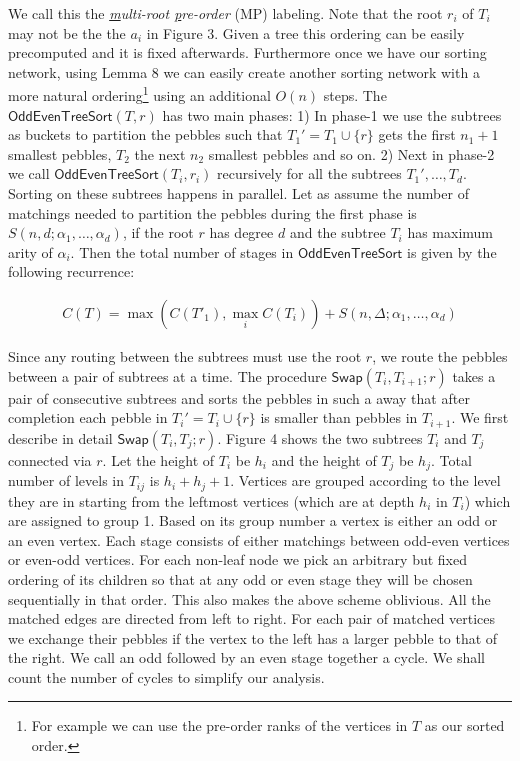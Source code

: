 \documentclass[runningheads,a4paper]{llncs}
\begin{document}
	

	
\noindent We call this the \textit{\underline{m}ulti-root \underline{p}re-order} (MP) labeling. Note that the root $r_i$ of $T_i$ may not be the the $a_i$ in Figure 3. Given a tree this ordering can be easily precomputed and it is fixed afterwards. Furthermore once we have our sorting network, using Lemma 8 we can easily create another sorting network with a more natural ordering\footnote{For example we can use the pre-order ranks of the vertices in $T$ as our sorted order.} using an additional $O(n)$ steps.
 The $\mathsf{OddEvenTreeSort}(T, r)$ has two main phases: 1) In phase-1 we use the subtrees as buckets to partition the pebbles such that $T_1' = T_1\cup\{r\}$ gets the first $n_1+1$ smallest pebbles, $T_2$ the next $n_2$ smallest pebbles and so on. 
2) Next in phase-2 we call $\mathsf{OddEvenTreeSort}(T_i,r_i)$ recursively for all the subtrees $T_1',\ldots,T_{d}$. Sorting on these subtrees happens in parallel. Let as assume the number of matchings needed to partition the pebbles during the first phase is $ S(n,d; \alpha_1,\ldots,\alpha_{d}) $, if the root $r$ has degree $d$ and the subtree $T_i$ has maximum arity of $\alpha_i$. Then the total number of stages in $\mathsf{OddEvenTreeSort}$ is given by the following recurrence:

\begin{align}
C(T) = \max(C(T'_1),\max_i{C(T_i)}) + S(n,\Delta; \alpha_1,\ldots,\alpha_d)
\end{align}



Since any routing between the subtrees must use the root $r$, we route the pebbles between a pair of subtrees at a time. The procedure $\mathsf{Swap}(T_i,T_{i+1};r)$ takes a pair of consecutive subtrees and sorts the pebbles in such a away that after completion each pebble in $T_i' = T_i \cup \{r\}$ is smaller than pebbles in $T_{i+1}$. We first describe in detail $\mathsf{Swap}(T_i,T_{j};r)$. Figure 4 shows the two subtrees $T_i$ and $T_j$ connected via $r$. Let the height of $T_i$ be $h_i$ and the height of $T_j$ be $h_j$. Total number of levels in $T_{ij}$ is $h_i+h_j+1$. Vertices are grouped according to the level they are in starting from the leftmost vertices (which are at depth $h_i$ in $T_i$) which are assigned to group 1. Based on its group number a vertex is either an odd or an even vertex. Each stage consists of either matchings between odd-even vertices or even-odd vertices. For each non-leaf node we pick an arbitrary but fixed ordering of its children so that at any odd or even stage they will be chosen sequentially in that order. This also makes the above scheme oblivious. All the matched edges are directed from left to right. For each pair of matched vertices we exchange their pebbles if the vertex to the left has a larger pebble to that of the right. We call an odd followed by an even stage together a cycle. We shall count the number of cycles to simplify our analysis. 
\end{document}
